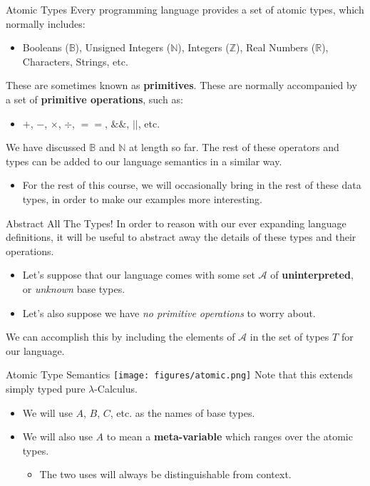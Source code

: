 \documentclass[11pt]{beamer}
\begin{document}
\begin{frame}[fragile=singleslide]{Atomic Types}
Every programming language provides a set of atomic types, which normally includes:
\begin{itemize}
\item Booleans ($\mathbb{B}$), Unsigned Integers ($\mathbb{N}$), Integers ($\mathbb{Z}$), Real Numbers ($\mathbb{R}$), Characters, Strings, etc.
\end{itemize}
These are sometimes known as \textbf{primitives}.  These are normally accompanied by a set of \textbf{primitive operations}, such as:
\begin{itemize}
\item $+$, $-$, $\times$, $\div$, $==$, $\&\&$, $||$, etc.
\end{itemize}
We have discussed $\mathbb{B}$ and $\mathbb{N}$ at length so far.  The rest of these operators and types can be added to our language semantics in a similar way.  
\begin{itemize}
\item For the rest of this course, we will occasionally bring in the rest of these data types, in order to make our examples more interesting.  
\end{itemize}
\end{frame}


\begin{frame}[fragile=singleslide]{Abstract All The Types!}
In order to reason with our ever expanding language definitions, it will be useful to abstract away the details of these types and their operations.

\begin{itemize}
\item Let's suppose that our language comes with some set $\mathcal{A}$ of \textbf{uninterpreted}, or \emph{unknown} base types.
\item Let's also suppose we have \emph{no primitive operations} to worry about.  
\end{itemize}
We can accomplish this by including the elements of $\mathcal{A}$ in the set of types $T$ for our language.
\end{frame}

\begin{frame}[fragile=singleslide]{Atomic Type Semantics}
\texttt{[image: figures/atomic.png]}
Note that this extends simply typed pure $\lambda$-Calculus.
\begin{itemize}
\item We will use $A$, $B$, $C$, etc. as the names of base types.  
\item We will also use $A$ to mean a \textbf{meta-variable} which ranges over the atomic types.
\begin{itemize}
\item The two uses will always be distinguishable from context.  
\end{itemize}
\end{itemize}
\end{frame}
\end{document}
